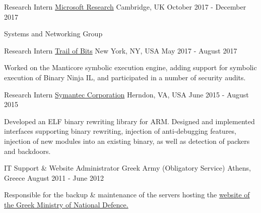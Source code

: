 

\begin{cventries}

  \cventry
    {Research Intern}
		{\href{October 2017 - December 2017}{Microsoft Research}} %
    {Cambridge, UK}
    {October 2017 - December 2017}
    {
      \begin{cvitems} %
      \item {Systems and Networking Group}
      \end{cvitems}
    }
  \cventry
    {Research Intern} %
		{\href{May 2017 - August 2017}{Trail of Bits}} %
    {New York, NY, USA}
    {May 2017 - August 2017}
    {
      \begin{cvitems} %
      \item {Worked on the Manticore symbolic execution engine, adding support
              for symbolic execution of Binary Ninja IL, and participated in
          a number of security audits.}
      \end{cvitems}
    }
  \cventry
    {Research Intern} %
		{\href{May 2015 - August 2015}{Symantec Corporation}} %
    {Herndon, VA, USA}
    {June 2015 - August 2015}
    {
      \begin{cvitems} %
        \item {Developed an ELF binary rewriting library for ARM. Designed and
            implemented interfaces supporting binary rewriting, injection of
              anti-debugging features, injection of new modules into an existing
              binary, as well as detection of packers and backdoors.}
      \end{cvitems}
    }

  \cventry
{IT Support \& Website Administrator} %
		{Greek Army (Obligatory Service)} %
    {Athens, Greece} %
    {August 2011 - June 2012} %
		{
      \begin{cvitems} %
      \item {Responsible for the backup \& maintenance of the servers hosting
          the \href{http://www.mod.mil.gr/mod/en/}{website of the Greek Ministry of National Defence.}}
      \end{cvitems}
        }


\end{cventries}
